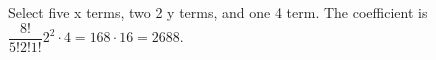 Select five x terms, two 2 y terms, and one 4 term. The coefficient is $\dfrac{8!}{5!2!1!}2^2\cdot4=168\cdot16=\boxed{2688}$.
